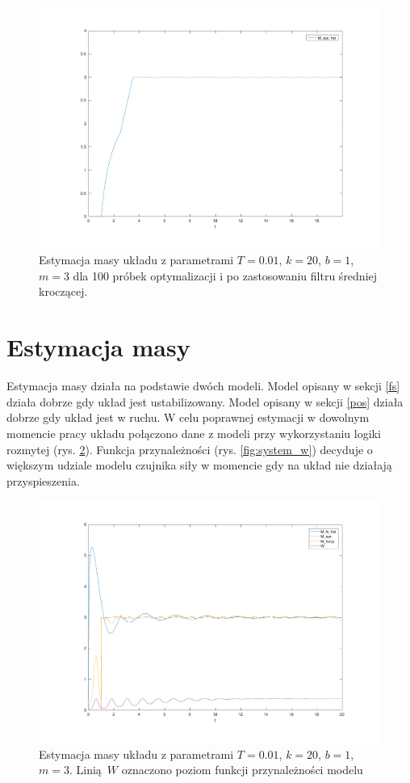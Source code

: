 \documentclass[a4paper, 10pt]{article}
\begin{document}
\begin{figure}[H]
	\includegraphics[width=0.99\linewidth]{filter_mass}
	\centering
	\caption{Estymacja masy układu z parametrami $T=0.01$, $k = 20$, $b = 1$, $m = 3$ dla 100 próbek optymalizacji i po zastosowaniu filtru średniej kroczącej.}
	\label{fig:filter_mass}
\end{figure}


\section{Estymacja masy}
Estymacja masy działa na podstawie dwóch modeli. Model opisany w sekcji \ref{fs} działa dobrze gdy układ jest ustabilizowany. Model opisany w sekcji \ref{pos} działa dobrze gdy układ jest w ruchu. W celu poprawnej estymacji w dowolnym momencie pracy układu połączono dane z modeli przy wykorzystaniu logiki rozmytej (rys. \ref{fig:system_mass}). Funkcja przynależności (rys. \ref{fig:system_w}) decyduje o większym udziale modelu czujnika siły w momencie gdy na układ nie działają przyspieszenia.

\begin{figure}[H]
	\includegraphics[width=0.99\linewidth]{system_mass}
	\centering
	\caption{Estymacja masy układu z parametrami $T=0.01$, $k = 20$, $b = 1$, $m = 3$. Linią $W$ oznaczono poziom funkcji przynależności modelu }
	\label{fig:system_mass}
\end{figure}
\end{document}

